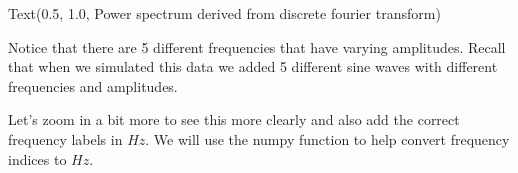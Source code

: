 \documentclass[letterpaper,10pt,english]{sphinxmanual}
\begin{document}
\begin{sphinxVerbatim}[commandchars=\\\{\}]
 
\PYG{p}{[}\PYG{p}{]} 
 
 
 
\end{sphinxVerbatim}

\begin{sphinxVerbatim}[commandchars=\\\{\}]
Text(0.5, 1.0, \PYGZsq{}Power spectrum derived from discrete fourier transform\PYGZsq{})
\end{sphinxVerbatim}

\noindent{}

Notice that there are 5 different frequencies that have varying amplitudes. Recall that when we simulated this data we added 5 different sine waves with different frequencies and amplitudes.


Let’s zoom in a bit more to see this more clearly and also add the correct frequency labels in \(Hz\). We will use the numpy  function to help convert frequency indices to \(Hz\).
\end{document}
